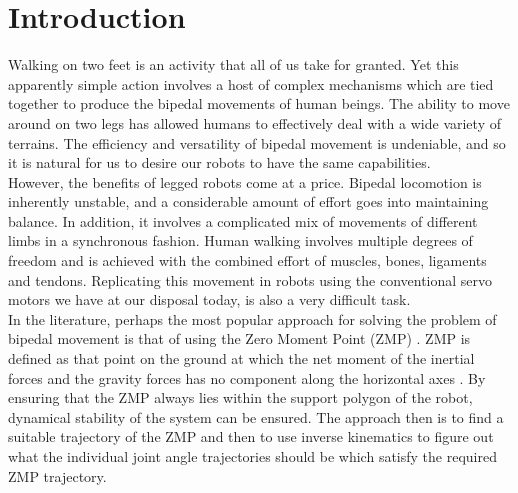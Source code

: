 \documentclass[12pt,twoside]{article}
\theoremstyle{plain}
\theoremstyle{definition}
\theoremstyle{remark}
\newcommand{\forceindent}{\leavevmode{\parindent=2em\indent}}
\begin{document}
\setcounter{tocdepth}{2} 					%
\tableofcontents
{}
\clearpage



\graphicspath{{images/}}

\section{Introduction}
\label{sec:introduction}
Walking on two feet is an activity that all of us take for granted. Yet this apparently simple action involves a host of complex mechanisms which are tied together to produce the bipedal movements of human beings. The ability to move around on two legs has allowed humans to effectively deal with a wide variety of terrains. The efficiency and versatility of bipedal movement is undeniable, and so it is natural for us to desire our robots to have the same capabilities.\\
\forceindent However, the benefits of legged robots come at a price. Bipedal locomotion is inherently unstable, and a considerable amount of effort goes into maintaining balance. In addition, it involves a complicated mix of  movements of different limbs in a synchronous fashion. Human walking involves multiple degrees of freedom and is achieved with the combined effort of muscles, bones, ligaments and tendons. Replicating this movement in robots using the conventional servo motors we have at our disposal today, is also a very difficult task.\\
\forceindent In the literature, perhaps the most popular approach for solving the problem of bipedal movement is that of using the  Zero Moment Point (ZMP) \cite{vukobratovic1969contribution, jurivcic1972mathematical}. ZMP is defined as that point on the ground at which the net moment of the inertial forces and the gravity forces has no component along the horizontal axes \cite{vukobratovic2004zero}. By ensuring that the ZMP always lies within the support polygon of the robot, dynamical stability of the system can be ensured. The approach then is to find a suitable trajectory of the ZMP and then to use inverse kinematics to figure out what the individual joint angle trajectories should be which satisfy the required ZMP trajectory.\\
\end{document}
